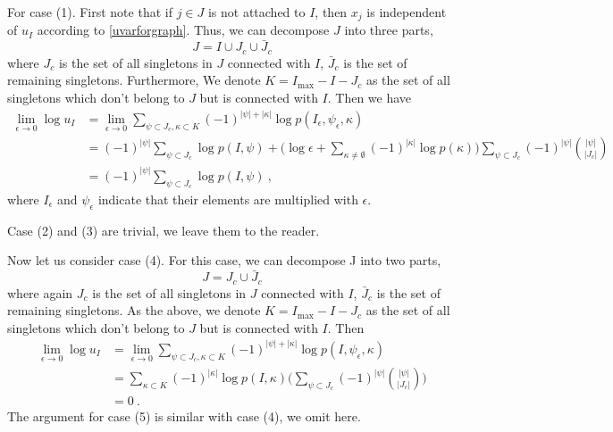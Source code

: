 \documentclass[hidelinks,12pt]{article}
\begin{document}
For case (1). First note that if $j\in J$ is not attached to $I$, then $x_{j}$ is independent of $u_{I}$ according to \eqref{uvarforgraph}. Thus, we can decompose $J$ into three parts, 
\begin{equation}
   J= I\cup J_{c}\cup \bar{J}_{c}
\end{equation}
where $J_{c}$ is the set of all singletons in $J$ connected with $I$, $\bar{J}_{c}$ is the set of remaining singletons. Furthermore, We denote $K=I_{\text{max}}-I-J_{c} $ as the set of all singletons which don't belong to $J$ but is connected with $I$. Then we have
\begin{align}
   \lim_{\epsilon \to 0}\log u_{I}&=\lim_{\epsilon \to 0}\sum_{\psi\subset J_{c},\kappa\subset K} (-1)^{\lvert \psi\rvert  +\lvert\kappa\rvert} \log p(I_{\epsilon},\psi_{\epsilon},\kappa) \nonumber \\ 
   &= (-1)^{\lvert \psi\rvert }\sum_{\psi\subset J_{c}}\log p(I,\psi) + \biggl(\log\epsilon +\sum_{\kappa\neq \emptyset}(-1)^{\lvert\kappa\rvert}\log p(\kappa)\biggr)\sum_{\psi\subset J_{c}}(-1)^{\lvert \psi\rvert } \binom{\lvert\psi\rvert }{\lvert J_{c}\rvert } \nonumber \\
   &=  (-1)^{\lvert \psi\rvert }\sum_{\psi\subset J_{c}}\log p(I,\psi) 
     \:,
\end{align}
where $I_{\epsilon}$ and $\psi_{\epsilon}$ indicate that their elements are multiplied with $\epsilon$.

Case (2) and (3) are trivial, we leave them to the reader. 

Now let us consider case (4). For this case, we can decompose J into two parts,
\begin{equation}
   J=J_{c}\cup \bar{J}_{c}
\end{equation}
where again $J_{c}$ is the set of all singletons in $J$ connected with $I$, $\bar{J}_{c}$ is the set of remaining singletons. As the above, we denote $K=I_{\text{max}}-I-J_{c} $ as the set of all singletons which don't belong to $J$ but is connected with $I$. Then
\begin{align}
   \lim_{\epsilon \to 0}\log u_{I}&=\lim_{\epsilon \to 0}\sum_{\psi\subset J_{c},\kappa\subset K} (-1)^{\lvert \psi\rvert  +\lvert\kappa\rvert} \log p(I,\psi_{\epsilon},\kappa) \nonumber \\ 
   &= \sum_{\kappa\subset K}(-1)^{\lvert\kappa\rvert}\log p(I,\kappa)\Biggl(\sum_{\psi\subset J_{c}}(-1)^{\lvert \psi\rvert } \binom{\lvert\psi\rvert }{\lvert J_{c}\rvert } \Biggr)\nonumber \\
   &=  0
     \:.
\end{align}
The argument for case (5) is similar with case (4), we omit here.
\end{document}
